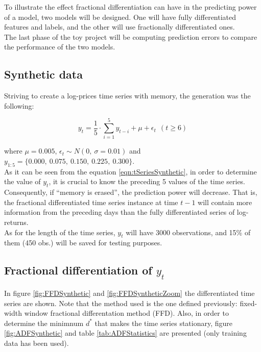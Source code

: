 \documentclass[a4paper]{article}
\begin{document}
To illustrate the effect fractional differentiation can have in the 
predicting power of a model, two models will be designed. One will have 
fully differentiated features and labels, and the other will use 
fractionally differentiated ones.\\

The last phase of the toy project will be computing prediction errors to 
compare the performance of the two models. 

\subsection{Synthetic data}
Striving to create a log-prices time series with memory, the generation was 
the following:

\begin{equation}
\label{eqn:tSeriesSynthetic}
	y_{t} = \frac{1}{5} \cdot \sum_{i = 1}^{5} y_{t - i} + 
	\mu + \epsilon_t \ \ (t \geq 6)
\end{equation}

where $\mu = 0.005$, $\epsilon_t \sim N(0,\ \sigma = 0.01)$ and 
$y_{1:5} = \{0.000,\ 0.075,\ 0.150,\ 0.225,\ 0.300\}$.\\

As it can be seen from the equation \ref{eqn:tSeriesSynthetic}, in order to 
determine the value of $y_t$, it is crucial to know the preceding 5 values 
of the time series. Consequently, if ``memory is erased'', the prediction 
power will decrease. That is, the fractional differentiated time series 
instance at time $t - 1$ will contain more information from the preceding 
days than the fully differentiated series of log-returns.\\

As for the length of the time series, $y_t$ will have 3000 observations, and 
15\% of them (450 obs.) will be saved for testing purposes.

\subsection{Fractional differentiation of $y_t$}
In figure \ref{fig:FFDSynthetic} and \ref{fig:FFDSyntheticZoom} the 
differentiated time series are shown. Note that the method used is the one 
defined previously: fixed-width window fractional differentation method 
(FFD). Also, in order to determine the minimnum $d^*$ that makes the time 
series stationary, figure \ref{fig:ADFSynthetic} and table 
\ref{tab:ADFStatistics} are presented (only training data has been used).\\
\end{document}
